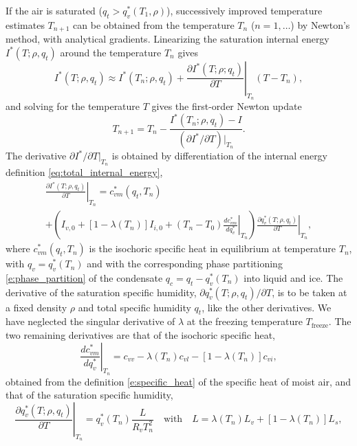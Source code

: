 \documentclass{report}
\begin{document}
If the air is saturated ($q_t > q_v^*(T_1, \rho)$), successively improved temperature estimates $T_{n+1}$ can be obtained from the temperature $T_n$ ($n=1,\dots$) by Newton's method, with analytical gradients. Linearizing the saturation internal energy $I^*(T; \rho, q_t)$ around the temperature $T_n$ gives
\begin{equation}
    I^*(T; \rho, q_t) \approx I^*(T_n; \rho, q_t) + \left.\frac{\partial I^*(T; \rho; q_t)}{\partial T}\right|_{T_n} (T - T_n),
\end{equation}
and solving for the temperature $T$ gives the first-order Newton update
\begin{equation}
    T_{n+1} = T_{n} - \frac{I^*(T_{n}; \rho, q_t) - I}{(\partial I^*/\partial T)|_{T_{n}}}.
\end{equation}
The derivative $\partial I^*/\partial T|_{T_n}$ is obtained by differentiation of the internal energy definition \eqref{eq:total_internal_energy},
\begin{multline}
     \left.\frac{\partial I^*(T; \rho, q_t)}{\partial T}\right|_{T_n} 
     = c_{vm}^*(q_t, T_n) \\
     +  \left( I_{v,0} + [1-\lambda(T_n)]I_{i,0} + (T_n - T_0) \left. \frac{dc_{vm}^*}{dq_v^*}\right|_{T_n} \right) \left. \frac{\partial q_v^*(T; \rho, q_t)}{\partial T}\right|_{T_n},
\end{multline}
where $c_{vm}^*(q_t, T_n)$ is the isochoric specific heat in equilibrium at temperature $T_n$, with $q_v = q_v^*(T_n)$ and with the corresponding phase partitioning \eqref{e:phase_partition} of the condensate $q_c = q_t - q_v^*(T_n)$ into liquid and ice. The derivative of the saturation specific humidity, $\partial q_v^*(T;\rho, q_t)/\partial T$, is to be taken at a fixed density $\rho$ and total specific humidity $q_t$, like the other derivatives. We have neglected the singular derivative of $\lambda$ at the freezing temperature $T_{\mathrm{freeze}}$. The two remaining derivatives are that of the isochoric specific heat,
\begin{equation}
    \left. \frac{dc_{vm}^*}{dq_v^*}\right|_{T_n} = c_{vv} - \lambda(T_n) c_{vl} - [1-\lambda(T_n)]c_{vi},
\end{equation}
obtained from the definition \eqref{e:specific_heat} of the specific heat of moist air, and that of the saturation specific humidity,
\begin{equation}
    \left. \frac{\partial q_v^*(T; \rho, q_t)}{\partial T}\right|_{T_n} = q_v^*(T_n) \frac{L}{R_v T_n^2} \quad \text{with} \quad L = \lambda(T_n) L_v + [1-\lambda(T_n)] L_s,
\end{equation}
\end{document}
